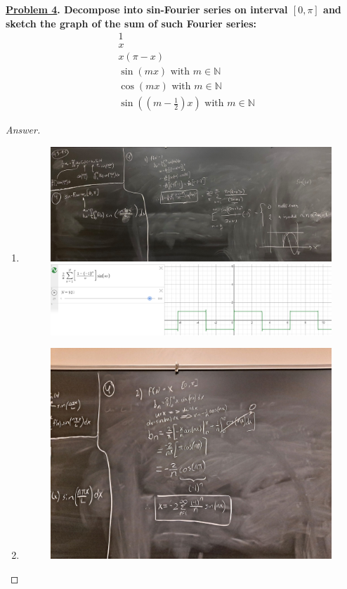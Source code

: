 \documentclass{article}
\theoremstyle{definition}
\renewcommand\qedsymbol{$\blacksquare$}
\newenvironment{ans}{\begin{proof}[Answer]\renewcommand{\qedsymbol}{}}{\end{proof}}
\newenvironment{boldenv}{\bfseries\boldmath}{}
\newcommand{\N}{\mathbb{N}}
\begin{document}
\begin{boldenv}
    \underline{Problem 4}. Decompose into sin-Fourier series on interval $[0, \pi]$ and sketch the graph of the sum of such Fourier series: \begin{align}
        & 1\\
        & x\\
        & x(\pi - x)\\
        & \sin(mx) \text{ with } m \in \N\\
        & \cos(mx) \text{ with } m \in \N\\
        & \sin((m - \frac{1}{2})x) \text{ with } m \in \N
    \end{align}
\end{boldenv}
\begin{ans}
    \begin{enumerate}
        \item \phantom{.}\begin{figure}[H]
            \centering
            \includegraphics[width = \textwidth]{Problem 4-1.png}
            \includegraphics[width = \textwidth]{Problem 4.1.png}
        \end{figure}
\newpage
        \item \phantom{.}
        \begin{figure}[H]
        \centering
        \includegraphics[width = \textwidth]{Problem 4 Part 2.jpeg}

\end{figure}
\end{enumerate}
\end{ans}
\end{document}

